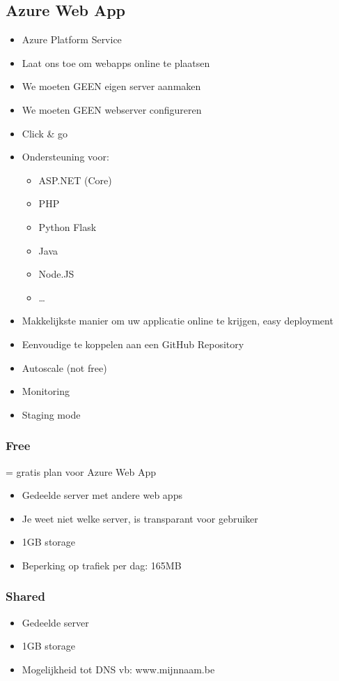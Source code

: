 \documentclass{article}
\begin{document}
\subsection{Azure Web App}
\begin{itemize}
    \item Azure Platform Service
    \item Laat ons toe om webapps online te plaatsen
    \item We moeten GEEN eigen server aanmaken
    \item We moeten GEEN webserver configureren
    \item Click \& go
    \item Ondersteuning voor:
    \begin{itemize}
        \item ASP.NET (Core)
        \item PHP
        \item Python Flask
        \item Java
        \item Node.JS
        \item \dots
    \end{itemize}
    \item Makkelijkste manier om uw applicatie online te krijgen, easy deployment
    \item Eenvoudige te koppelen aan een GitHub Repository
    \item Autoscale (not free)
    \item Monitoring
    \item Staging mode
\end{itemize}

\subsubsection{Free}
= gratis plan voor Azure Web App

\begin{itemize}
    \item Gedeelde server met andere web apps
    \item Je weet niet welke server, is transparant voor gebruiker
    \item 1GB storage
    \item Beperking op trafiek per dag: 165MB
\end{itemize}

\subsubsection{Shared}
\begin{itemize}
    \item Gedeelde server
    \item 1GB storage
    \item Mogelijkheid tot DNS vb: www.mijnnaam.be
\end{itemize}
\end{document}
